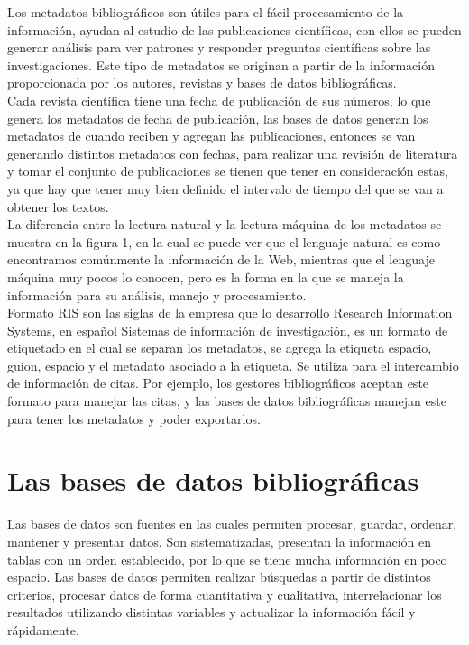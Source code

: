 \documentclass[../Main.tex]{subfiles}
\begin{document}
Los metadatos bibliográficos son útiles para el fácil procesamiento de la información, ayudan al estudio de las publicaciones científicas, con ellos se pueden generar análisis para ver patrones y responder preguntas científicas sobre las investigaciones. Este tipo de metadatos se originan a partir de la información proporcionada por los autores, revistas y bases de datos bibliográficas.\\

Cada revista científica tiene una fecha de publicación de sus números, lo que genera los metadatos de fecha de publicación, las bases de datos generan los metadatos de cuando reciben y agregan las publicaciones, entonces se van generando distintos metadatos con fechas, para realizar una revisión de literatura y tomar el conjunto de publicaciones se tienen que tener en consideración estas, ya que hay que tener muy bien definido el intervalo de tiempo del que se van a obtener los textos.\\

La diferencia entre la lectura natural y la lectura máquina de los metadatos se muestra en la figura 1, en la cual se puede ver que el lenguaje natural es como encontramos comúnmente la información de la Web, mientras que el lenguaje máquina muy pocos lo conocen, pero es la forma en la que se maneja la información para su análisis, manejo y procesamiento. \\
  
Formato RIS son las siglas de la empresa que lo desarrollo Research Information Systems, en español Sistemas de información de investigación, es un formato de etiquetado en el cual se separan los metadatos, se agrega la etiqueta espacio, guion, espacio y el metadato asociado a la etiqueta. Se utiliza para el intercambio de información de citas. Por ejemplo, los gestores bibliográficos aceptan este formato para manejar las citas, y las bases de datos bibliográficas manejan este para tener los metadatos y poder exportarlos.\\

\section{Las bases de datos bibliográficas}
\noindent
Las bases de datos son fuentes en las cuales permiten procesar, guardar, ordenar, mantener y presentar datos. Son sistematizadas, presentan la información en tablas con un orden establecido, por lo que se tiene mucha información en poco espacio. Las bases de datos permiten realizar búsquedas a partir de distintos criterios, procesar datos de forma cuantitativa y cualitativa, interrelacionar los resultados utilizando distintas variables y actualizar la información fácil y rápidamente.\\
\end{document}
